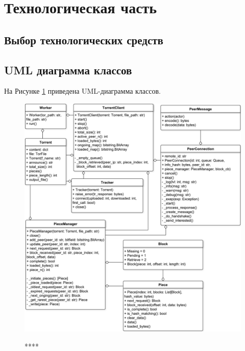 \section{Технологическая часть}

\subsection{Выбор технологических средств}


\subsection{UML диаграмма классов}
На Рисунке \ref{fig300:image} приведена UML-диаграмма классов. 
\begin{figure}[h]
	\begin{center}
		{\includegraphics[scale = 0.57]{img/uml.pdf}}
		\caption{****}
		\label{fig300:image}
	\end{center}
\end{figure}

